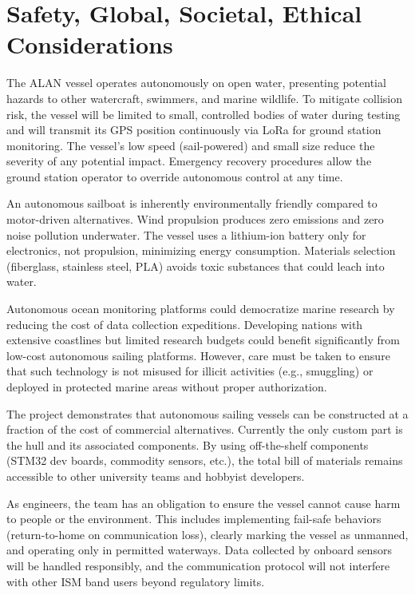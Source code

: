 
\section{Safety, Global, Societal, Ethical Considerations}
\label{sec:impact}

The ALAN vessel operates autonomously on open water, presenting potential hazards to other watercraft, swimmers, and marine wildlife. To mitigate collision risk, the vessel will be limited to small, controlled bodies of water during testing and will transmit its GPS position continuously via LoRa for ground station monitoring. The vessel's low speed (sail-powered) and small size reduce the severity of any potential impact. Emergency recovery procedures allow the ground station operator to override autonomous control at any time.

An autonomous sailboat is inherently environmentally friendly compared to motor-driven alternatives. Wind propulsion produces zero emissions and zero noise pollution underwater. The vessel uses a lithium-ion battery only for electronics, not propulsion, minimizing energy consumption. Materials selection (fiberglass, stainless steel, PLA) avoids toxic substances that could leach into water. 

Autonomous ocean monitoring platforms could democratize marine research by reducing the cost of data collection expeditions. Developing nations with extensive coastlines but limited research budgets could benefit significantly from low-cost autonomous sailing platforms. However, care must be taken to ensure that such technology is not misused for illicit activities (e.g., smuggling) or deployed in protected marine areas without proper authorization.

The project demonstrates that autonomous sailing vessels can be constructed at a fraction of the cost of commercial alternatives. Currently the only custom part is the hull and its associated components. By using off-the-shelf components (STM32 dev boards, commodity sensors, etc.), the total bill of materials remains accessible to other university teams and hobbyist developers.

As engineers, the team has an obligation to ensure the vessel cannot cause harm to people or the environment. This includes implementing fail-safe behaviors (return-to-home on communication loss), clearly marking the vessel as unmanned, and operating only in permitted waterways. Data collected by onboard sensors will be handled responsibly, and the communication protocol will not interfere with other ISM band users beyond regulatory limits.

